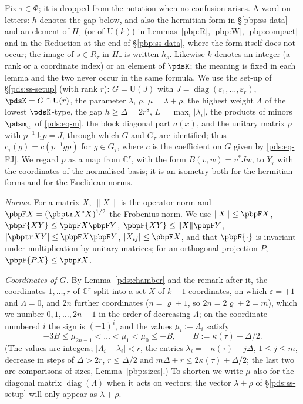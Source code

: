 \documentclass[10pt]{amsart}
\theoremstyle{definition}
\theoremstyle{remark}
\newcommand{\C}{\mathbb C}
\providecommand{\auPl}{\Phi}
\providecommand{\auU}{\mathrm U}
\begin{document}
Fix $\tau\in\auPl$; it is dropped from the notation when no confusion arises. A word on letters: $h$ denotes the gap below, and also the hermitian form in
\S\ref{pbp:ss-data} and an element of $H_\tau$ (or of $\auU(k)$) in Lemmas~\ref{pbp:R}, \ref{pbp:W}, \ref{pbp:compact} and in the
Reduction at the end of \S\ref{pbp:ss-data}, where the form itself does not occur; the image of
$s\in R_\tau$ in $H_\tau$ is written $h_s$. Likewise $k$
denotes an integer (a rank or a coordinate index) or an element of $\pdsK$; the meaning is fixed in
each lemma and the two never occur in the same formula. We use the set-up of
\S\ref{pds:ss-setup} (with rank $r$): $G=\auU(J)$ with $J=\operatorname{diag}(\varepsilon_1,\dots,
\varepsilon_r)$, $\pdsK=G\cap\auU(r)$, the parameter $\lambda$, $\rho$, $\mu=\lambda+\rho$, the
highest weight $\Lambda$ of the lowest $\pdsK$-type, the gap $h\ge\Delta=2r^8$, $L=\max_i|\lambda_i|$,
the products of minors $\pdsm_w$ of \eqref{pds:eq-m}, the block diagonal part $a(x)$, and the unitary
matrix $p$ with $p^{-1}\mathsf J_1p=J$, through which $G$ and $G_\tau$ are identified; thus
$c_\tau(g)=c(p^{-1}gp)$ for $g\in G_\tau$, where $c$ is the coefficient on $G$ given by
\eqref{pds:eq-FJ}. We regard $p$ as a map from $\C^r$, with the form $B(v,w)=v^*Jw$, to $Y_\tau$ with
the coordinates of the normalised basis; it is an isometry both for the hermitian forms and for
the Euclidean norms.

\emph{Norms.} For a matrix $X$, $\|X\|$ is the operator norm and $\pbpF X=(\pbptr X^*X)^{1/2}$ the
Frobenius norm. We use $\|X\|\le\pbpF X$, $\pbpF{XY}\le\pbpF X\pbpF Y$, $\pbpF{XY}\le\|X\|\pbpF Y$,
$|\pbptr XY|\le\pbpF X\pbpF Y$, $|X_{ij}|\le\pbpF X$, and that $\pbpF{\cdot}$ is invariant under
multiplication by unitary matrices; for an orthogonal projection $P$, $\pbpF{PX}\le\pbpF X$.

\emph{Coordinates of $G$.} By Lemma~\ref{pds:chamber} and the remark after it, the coordinates
$1,\dots,r$ of $\C^r$ split into a set $X$ of $k-1$ coordinates, on which $\varepsilon=+1$ and
$\Lambda=0$, and $2n$ further coordinates ($n=\varrho+1$, so $2n=2\varrho+2=m$), which we number
$0,1,\dots,2n-1$ in the order of decreasing $\Lambda$; on the coordinate numbered $i$ the sign is
$(-1)^i$, and the values $\mu_i:=\Lambda_i$ satisfy
\begin{equation}\label{pbp:eq-steep}
-3B\le\mu_{2n-1}<\dots<\mu_1<\mu_0\le-B,\qquad B:=\kappa(\tau)+\Delta/2 .
\end{equation}
(The values are integers; $|\Lambda_i-\lambda_i|<r$, the entries $\lambda_i=-\kappa(\tau)-j\Delta$,
$1\le j\le m$, decrease in steps of $\Delta>2r$, $r\le\Delta/2$ and $m\Delta+r\le2\kappa(\tau)+
\Delta/2$; the last two are comparisons of sizes, Lemma~\ref{pbp:sizes}.) To shorten we write
$\mu$ also for the diagonal matrix $\operatorname{diag}(\Lambda)$ when it acts on vectors; the
vector $\lambda+\rho$ of \S\ref{pds:ss-setup} will only appear as $\lambda+\rho$.
\end{document}
